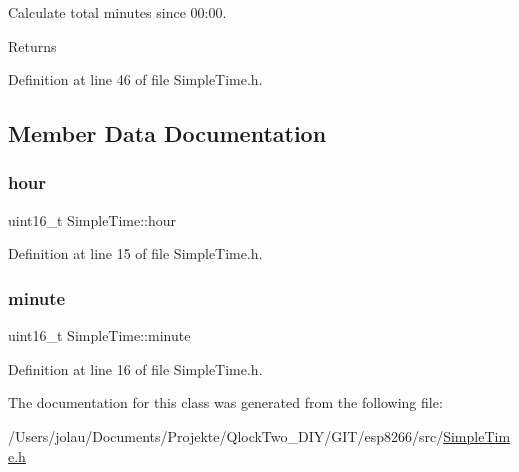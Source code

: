 Calculate total minutes since 00\+:00. 

\begin{DoxyReturn}{Returns}

\end{DoxyReturn}


Definition at line 46 of file Simple\+Time.\+h.



\subsection{Member Data Documentation}
\mbox{\label{class_simple_time_a3818c7ef3b2f7d685e403f6bbf993bdc}} 
\subsubsection{\texorpdfstring{hour}{hour}}
{\footnotesize\ttfamily uint16\+\_\+t Simple\+Time\+::hour\hspace{0.3cm}{\ttfamily [private]}}



Definition at line 15 of file Simple\+Time.\+h.

\mbox{\label{class_simple_time_ad8cfa601eddca64717e27a8ec95cddfa}} 
\subsubsection{\texorpdfstring{minute}{minute}}
{\footnotesize\ttfamily uint16\+\_\+t Simple\+Time\+::minute\hspace{0.3cm}{\ttfamily [private]}}



Definition at line 16 of file Simple\+Time.\+h.



The documentation for this class was generated from the following file\+:\begin{DoxyCompactItemize}
\item 
/\+Users/jolau/\+Documents/\+Projekte/\+Qlock\+Two\+\_\+\+D\+I\+Y/\+G\+I\+T/esp8266/src/\mbox{\hyperlink{_simple_time_8h}{Simple\+Time.\+h}}\end{DoxyCompactItemize}
